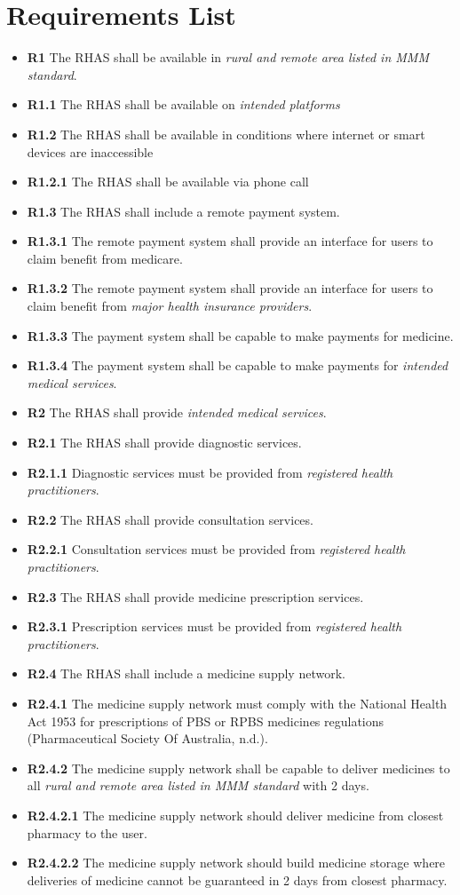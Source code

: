 \documentclass{article}
\begin{document}
\section{Requirements List}
\begin{itemize}[label={}]
\item \textbf{R1} The RHAS shall be available in \textit{rural and remote area listed in MMM standard}.
\item \textbf{R1.1} The RHAS shall be available on \textit{intended platforms}
\item \textbf{R1.2} The RHAS shall be available in conditions where internet or smart devices are inaccessible
\item \textbf{R1.2.1} The RHAS shall be available via phone call
\item \textbf{R1.3} The RHAS shall include a remote payment system.
\item \textbf{R1.3.1} The remote payment system shall provide an interface for users to claim benefit from medicare.
\item \textbf{R1.3.2} The remote payment system shall provide an interface for users to claim benefit from \textit{major health insurance providers}.
\item \textbf{R1.3.3} The payment system shall be capable to make payments for medicine.
\item \textbf{R1.3.4} The payment system shall be capable to make payments for \textit{intended medical services}.
\item \textbf{R2} The RHAS shall provide \textit{intended medical services}.
\item \textbf{R2.1} The RHAS shall provide diagnostic services.
\item \textbf{R2.1.1} Diagnostic services must be provided from \textit{registered health practitioners}.
\item \textbf{R2.2} The RHAS shall provide consultation services.
\item \textbf{R2.2.1} Consultation services must be provided from \textit{registered health practitioners}.
\item \textbf{R2.3} The RHAS shall provide medicine prescription services.
\item \textbf{R2.3.1} Prescription services must be provided from \textit{registered health practitioners}.
\item \textbf{R2.4} The RHAS shall include a medicine supply network.
\item \textbf{R2.4.1} The medicine supply network must comply with the National Health Act 1953 for prescriptions of PBS or RPBS medicines regulations (Pharmaceutical Society Of Australia, n.d.).
\item \textbf{R2.4.2} The medicine supply network shall be capable to deliver medicines to all \textit{rural and remote area listed in MMM standard} with 2 days.
\item \textbf{R2.4.2.1} The medicine supply network should deliver medicine from closest pharmacy to the user.
\item \textbf{R2.4.2.2} The medicine supply network should build medicine storage where deliveries of medicine cannot be guaranteed in 2 days from closest pharmacy.\\
\end{itemize}
\end{document}
